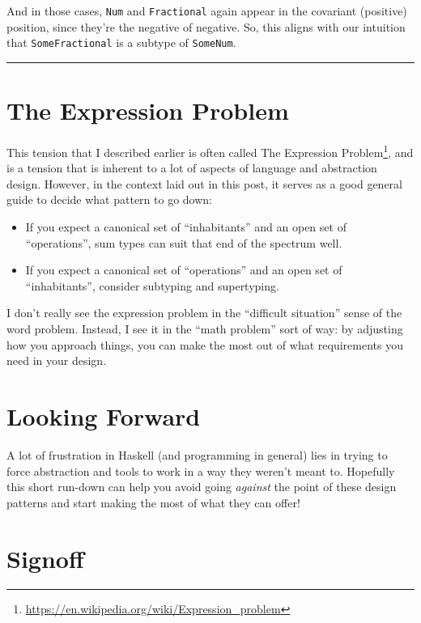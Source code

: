 \documentclass[]{article}
\renewcommand{\href}[2]{#2\footnote{\url{#1}}}
\begin{document}
And in those cases, \texttt{Num} and \texttt{Fractional} again appear in the
covariant (positive) position, since they're the negative of negative. So, this
aligns with our intuition that \texttt{SomeFractional} is a subtype of
\texttt{SomeNum}.

\begin{center}\rule{0.5\linewidth}{0.5pt}\end{center}

\section{The Expression Problem}\label{the-expression-problem}

This tension that I described earlier is often called
\href{https://en.wikipedia.org/wiki/Expression_problem}{The Expression Problem},
and is a tension that is inherent to a lot of aspects of language and
abstraction design. However, in the context laid out in this post, it serves as
a good general guide to decide what pattern to go down:

\begin{itemize}
\tightlist
\item
  If you expect a canonical set of ``inhabitants'' and an open set of
  ``operations'', sum types can suit that end of the spectrum well.
\item
  If you expect a canonical set of ``operations'' and an open set of
  ``inhabitants'', consider subtyping and supertyping.
\end{itemize}

I don't really see the expression problem in the ``difficult situation'' sense
of the word problem. Instead, I see it in the ``math problem'' sort of way: by
adjusting how you approach things, you can make the most out of what
requirements you need in your design.

\section{Looking Forward}\label{looking-forward}

A lot of frustration in Haskell (and programming in general) lies in trying to
force abstraction and tools to work in a way they weren't meant to. Hopefully
this short run-down can help you avoid going \emph{against} the point of these
design patterns and start making the most of what they can offer!

\section{Signoff}\label{signoff}
\end{document}
